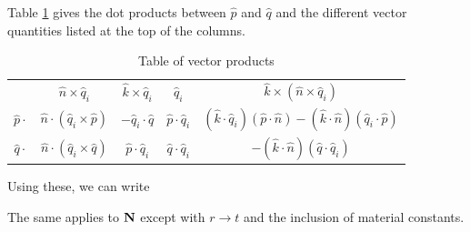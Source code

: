 Table \ref{tableofdotproducts} gives the dot products between $\hat{p}$ and $\hat{q}$ and the different vector quantities listed at the top of the columns.
\begin{table}[htp]
\caption{Table of vector products}
\vspace{-3mm}
\begin{center}
\begin{tabular}{|c||c|c|c|c|}
\hline
& $\hat{n}\times\hat{q}_i$ & $\hat{k}\times\hat{q}_i$ & $\hat{q}_i$ & $\hat{k}\times(\hat{n}\times\hat{q}_i)$ \\ \hhline{|=|=|=|=|=|}
$\hat{p} \cdot$ & $\hat{n}\cdot (\hat{q}_i\times\hat{p}) $ & $-\hat{q}_i\cdot \hat{q}$  & $\hat{p}\cdot \hat{q}_i$ & $(\hat{k} \cdot \hat{q}_i) (\hat{p} \cdot \hat{n}) - (\hat{k} \cdot \hat{n}) (\hat{q}_i \cdot \hat{p}) $ \\ \hline
$\hat{q} \cdot$ & $\hat{n}\cdot (\hat{q}_i\times\hat{q}) $ & $\hat{p}\cdot \hat{q}_i$ &$ \hat{q} \cdot  \hat{q}_i$ & $ -(\hat{k} \cdot \hat{n}) (\hat{q} \cdot \hat{q}_i) $ \\ \hline
\end{tabular}
\end{center}
\label{tableofdotproducts}
\end{table}%

Using these, we can write

The same applies to $\mathbf{N}$ except with $r \rightarrow t$ and the inclusion of material constants. 

